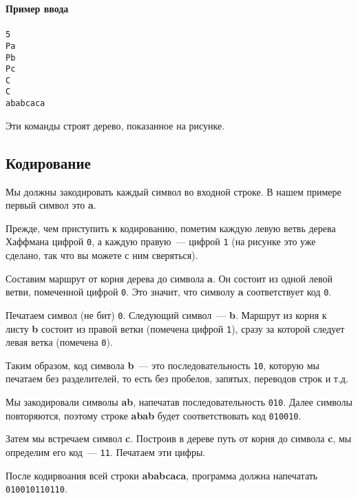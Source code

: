 ﻿\documentclass[a4paper,10pt]{article}
\begin{document}
\noindent\textbf{Пример ввода}\\
\texttt{ \\
5\\
Pa\\
Pb\\
Pc\\
C\\
C\\
ababcaca
}

Эти команды строят дерево, показанное на рисунке.

\subsection*{Кодирование}

Мы должны закодировать каждый символ во входной строке.
В нашем примере первый символ это \textbf{a}.

Прежде, чем приступить к кодированию, пометим каждую левую ветвь дерева Хаффмана цифрой \texttt{0}, а каждую правую~--- цифрой \texttt{1} (на рисунке это уже сделано, так что вы можете с ним сверяться).

Составим маршрут от корня дерева до символа \textbf{a}.
Он состоит из одной левой ветви, помеченной цифрой \texttt{0}.
Это значит, что символу \textbf{a} соответствует код \texttt{0}.

Печатаем символ (не бит) \texttt{0}.
Следующий символ~--- \textbf{b}. Маршрут из корня к листу \textbf{b} состоит из правой ветки (помечена цифрой \texttt{1}), сразу за которой следует левая ветка (помечена \texttt{0}).

Таким образом, код символа \textbf{b}~--- это последовательность \texttt{10}, которую мы печатаем без разделителей, то есть без пробелов, запятых, переводов строк и т.д.

Мы закодировали символы \textbf{ab}, напечатав последовательность \texttt{010}.
Далее символы повторяются, поэтому строке \textbf{abab} будет соответствовать код \texttt{010010}.

Затем мы встречаем символ \textbf{c}.
Построив в дереве путь от корня до символа \textbf{c}, мы определим его код~--- \texttt{11}.
Печатаем эти цифры.

После кодирвоания всей строки \textbf{ababcaca}, программа должна напечатать \texttt{010010110110}.
\end{document}
